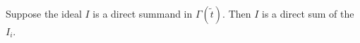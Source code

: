 Suppose the ideal $I$ is a direct summand in $\Gamma(\tilde{t})$. Then $I$ is a direct sum of the $I_i$.
